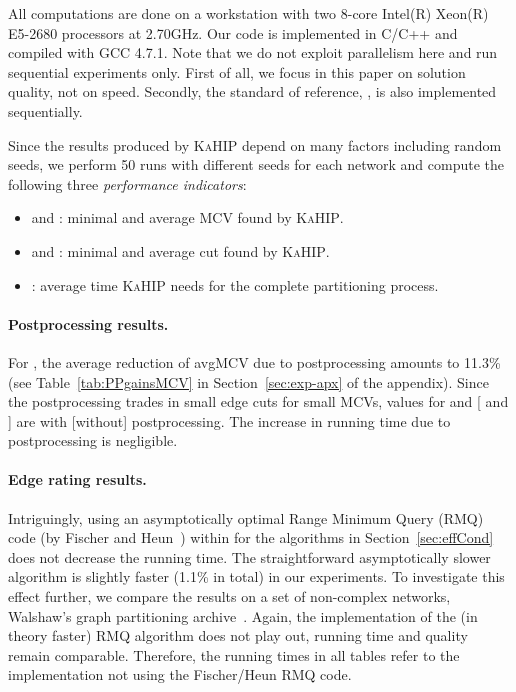\documentclass[pdftex]{llncs}
\newcommand{\kahip}{\textsc{KaHIP}\xspace}
\numberwithin{equation}{section}
\numberwithin{example}{section}
\numberwithin{table}{section}
\begin{document}
All computations are done on a workstation with two 8-core Intel(R)
Xeon(R) E5-2680 processors at 2.70GHz. Our code is implemented in
C/C++ and compiled with GCC 4.7.1.  Note that we do not exploit
parallelism here and run sequential experiments only.  First of all,
we focus in this paper on solution quality, not on speed. Secondly,
the standard of reference, , is also implemented sequentially.

Since the results produced by \kahip depend on many factors including random seeds,
we perform 50 runs with different seeds for each network and compute the following three {\em performance
  indicators}:

\begin{itemize}[noitemsep,nolistsep]
\item  and : minimal and average MCV found by \kahip. 
\item  and : minimal and average cut found by \kahip. 
\item : average time \kahip needs for the complete partitioning process.
\end{itemize}




\paragraph{Postprocessing results.}
For , the average reduction of avgMCV due to
postprocessing amounts to 11.3\% (see Table~\ref{tab:PPgainsMCV} in
Section~\ref{sec:exp-apx} of the appendix). Since the postprocessing
trades in small edge cuts for small MCVs, values for  and
 [ and ] are with [without]
postprocessing. The increase in running time due to postprocessing is
negligible.
\vspace{-1.75ex}
\paragraph{Edge rating results.}
Intriguingly, using an asymptotically optimal Range Minimum Query
(RMQ) code (by Fischer and Heun~\cite{Fischer2006a}) within 
for the algorithms in Section~\ref{sec:effCond} 
does not decrease the running time. The straightforward asymptotically
slower algorithm is slightly faster (1.1\% in total) in our
experiments. To investigate this effect further, we compare the results on a set of 
non-complex networks, Walshaw's graph partitioning
archive~\cite{SoperWC04combined}. Again, the implementation of the (in
theory faster) RMQ algorithm does not play out, running time and
quality remain comparable. Therefore, the running times in all tables
refer to the implementation not using the Fischer/Heun RMQ code.
\end{document}
